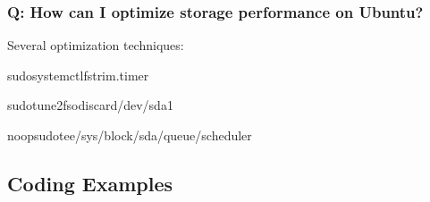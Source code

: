 \documentclass[letterpaper,10pt,english]{sphinxmanual}
\begin{document}
\subsubsection{Q: How can I optimize storage performance on Ubuntu?}
\label{\detokenize{storage-overview:q-how-can-i-optimize-storage-performance-on-ubuntu}}
\sphinxAtStartPar
{} Several optimization techniques:

\begin{sphinxVerbatim}[commandchars=\\\{\}]
sudosystemctlfstrim.timer

sudotune2fs\PYGZhy{}odiscard/dev/sda1


noopsudotee/sys/block/sda/queue/scheduler
\end{sphinxVerbatim}


\subsection{Coding Examples}
\label{\detokenize{storage-overview:coding-examples}}
\end{document}
